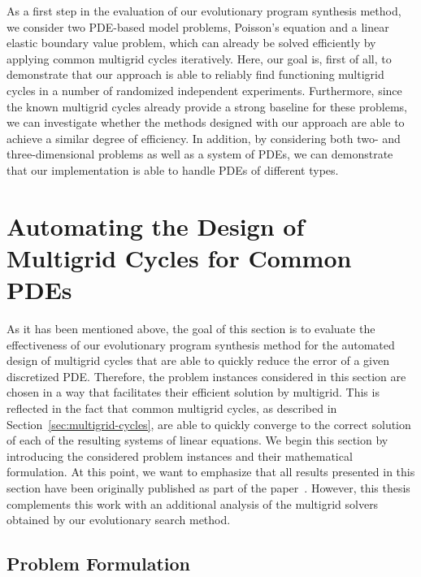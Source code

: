 As a first step in the evaluation of our evolutionary program synthesis method, we consider two PDE-based model problems, Poisson's equation and a linear elastic boundary value problem, which can already be solved efficiently by applying common multigrid cycles iteratively.
Here, our goal is, first of all, to demonstrate that our approach is able to reliably find functioning multigrid cycles in a number of randomized independent experiments.
Furthermore, since the known multigrid cycles already provide a strong baseline for these problems, we can investigate whether the methods designed with our approach are able to achieve a similar degree of efficiency.
In addition, by considering both two- and three-dimensional problems as well as a system of PDEs, we can demonstrate that our implementation is able to handle PDEs of different types.
\section{Automating the Design of Multigrid Cycles for Common PDEs}
\label{sec:experiments-part1}
As it has been mentioned above, the goal of this section is to evaluate the effectiveness of our evolutionary program synthesis method for the automated design of multigrid cycles that are able to quickly reduce the error of a given discretized PDE.
Therefore, the problem instances considered in this section are chosen in a way that facilitates their efficient solution by multigrid.
This is reflected in the fact that common multigrid cycles, as described in Section~\ref{sec:multigrid-cycles}, are able to quickly converge to the correct solution of each of the resulting systems of linear equations.
We begin this section by introducing the considered problem instances and their mathematical formulation.
At this point, we want to emphasize that all results presented in this section have been originally published as part of the paper~\cite{schmitt2021evostencils}.
However, this thesis complements this work with an additional analysis of the multigrid solvers obtained by our evolutionary search method.
\subsection{Problem Formulation}
